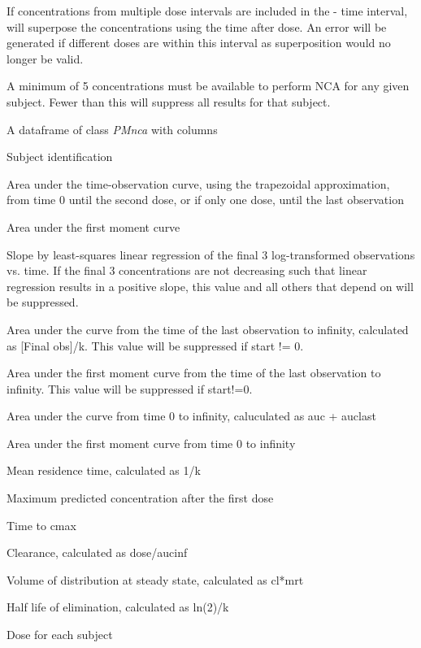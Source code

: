 \documentclass[a4paper]{book}
\begin{document}
%
\begin{Details}\relax
If concentrations from multiple dose intervals are included in the - time interval,
 will superpose the concentrations using the time after dose.  An error will be generated if
different doses are within this interval as superposition would no longer be valid.

A minimum of 5 concentrations must be available to perform NCA for any given subject.  Fewer than this will
suppress all results for that subject.
\end{Details}
%
\begin{Value}
A dataframe of class \emph{PMnca} with columns
\begin{ldescription}
\item[\code{id }] Subject identification
\item[\code{auc }] Area under the time-observation curve, using the trapezoidal approximation, from time 0 until the second dose, 
or if only one dose, until the last observation
\item[\code{aumc }] Area under the first moment curve
\item[\code{k }] Slope by least-squares linear regression of the final 3 log-transformed observations vs. time.  
If the final 3 concentrations are not decreasing such that linear regression results in a positive slope,
this value and all others that depend on  will be suppressed.
\item[\code{auclast }] Area under the curve from the time of the last observation to infinity, calculated as [Final obs]/k.
This value will be suppressed if start != 0.
\item[\code{aumclast }] Area under the first moment curve from the time of the last observation to infinity.
This value will be suppressed if start!=0.
\item[\code{aucinf }] Area under the curve from time 0 to infinity, caluculated as auc + auclast
\item[\code{aumcinf }] Area under the first moment curve from time 0 to infinity
\item[\code{mrt }] Mean residence time, calculated as 1/k
\item[\code{cmax }] Maximum predicted concentration after the first dose
\item[\code{tmax }] Time to cmax
\item[\code{cl }] Clearance, calculated as dose/aucinf
\item[\code{vdss }] Volume of distribution at steady state, calculated as cl*mrt
\item[\code{thalf }] Half life of elimination, calculated as ln(2)/k
\item[\code{dose }] Dose for each subject
\end{ldescription}
\end{Value}
\end{document}
